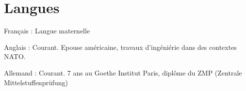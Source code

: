 
\section{Langues}


\begin{itemize}


\myitem
{Français :}
{Langue maternelle}

\myitem
{Anglais :}
{Courant. Epouse américaine, travaux d'ingéniérie dans des contextes NATO.
}

\myitem
{Allemand :}
{Courant. 7 ans au Goethe Institut Paris, diplôme du ZMP (Zentrale Mittelstuffenprüfung) }


\end{itemize}